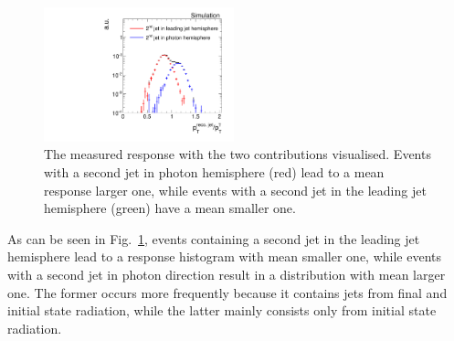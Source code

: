 \begin{figure}[!b]
  \centering
  \vspace{35pt}
      \includegraphics[width=0.49\textwidth]{figures/resolution/methodology/fullResponseAndContributions_6_alpha_bin.pdf}
  \caption{The measured response with the two contributions visualised. Events with a second jet in photon hemisphere (red) lead to a mean response larger one, while events with a
           second jet in the leading jet hemisphere (green) have a mean smaller one.}  
  \label{fig:fullResponseAndContributions}
\end{figure}

As can be seen in Fig.~\ref{fig:fullResponseAndContributions}, events containing a second jet in the leading jet hemisphere lead to a response histogram with mean smaller one, while events with a second jet in photon direction result in a distribution with mean larger one. 
The former occurs more frequently because it contains jets from final and initial state radiation, while the latter mainly consists only from initial state radiation.



